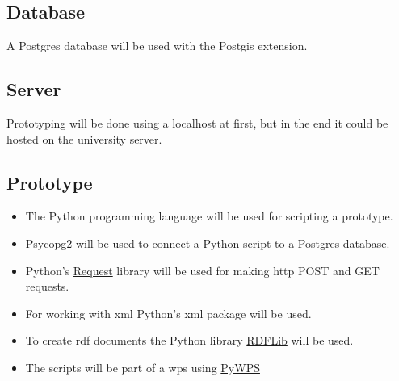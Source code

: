 \subsection{Database}
A Postgres database will be used with the Postgis extension.

\subsection{Server}
Prototyping will be done using a localhost at first, but in the end it could be hosted on the university server.


\subsection{Prototype}
\begin{itemize}
	\item The Python programming language will be used for scripting a prototype. 
	\item Psycopg2 will be used to connect a Python script to a Postgres database.
	\item Python's \href{http://docs.python-requests.org/en/latest/user/quickstart/}{Request} library will be used for making \ac{http} POST and GET requests. 
	\item For working with \ac{xml} Python's xml package will be used.
	\item To create \ac{rdf} documents the Python library \href{https://rdflib.readthedocs.org/en/stable/}{RDFLib} will be used. 
	\item The scripts will be part of a \ac{wps} using \href{http://pywps.wald.intevation.org/}{PyWPS} 
\end{itemize}









  

